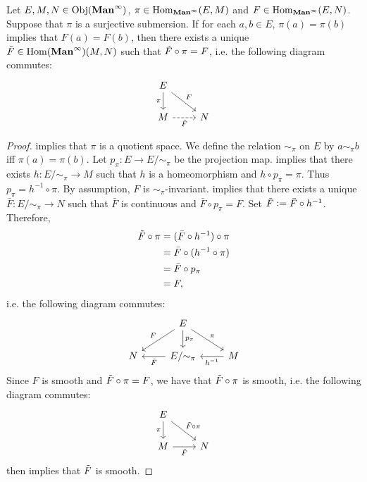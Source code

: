 \documentclass{book}
\begin{document}
	\begin{ex} 
		Let $E, M, N \in \operatorname{Obj}(\operatorname*{\text{\textbf{Man}}^{\infty}})$, $\pi \in \operatorname{Hom}_{\operatorname*{\text{\textbf{Man}}^{\infty}}}(E, M)$ and $F \in \operatorname{Hom}_{\operatorname*{\text{\textbf{Man}}^{\infty}}}(E, N)$. Suppose that $\pi$ is a surjective submersion. If for each $a,b \in E$, $\pi(a) = \pi(b)$ implies that $F(a) = F(b)$, then there exists a unique $\tilde{F} \in \operatorname{Hom}(\operatorname*{\text{\textbf{Man}}^{\infty}})(M, N)$ such that $\tilde{F} \circ \pi = F$, i.e. the following diagram commutes:
		\[ 
		\begin{tikzcd}
			E \arrow[d, "\pi"'] \arrow[dr, "F"] &   \\
			M \arrow[r, "\tl{F}"', dashrightarrow] &  N
		\end{tikzcd}
		\]
	\end{ex}

	\begin{proof}
		 implies that $\pi$ is a quotient space. We define the relation $\sim_{\pi}$ on $E$ by $a \sim_{\pi} b$ iff $\pi(a) = \pi(b)$. Let $p_{\pi}:E \rightarrow E/{\sim_{\pi}}$ be the projection map.  implies that there exists $h: E/{\sim_{\pi}} \rightarrow M$ such that $h$ is a homeomorphism and $h \circ p_{\pi} = \pi$. Thus $p_{\pi} = h^{-1} \circ \pi$. By assumption, $F$ is $\sim_{\pi}$-invariant.  implies that there exists a unique $\bar{F}: E/{\sim_{\pi}} \rightarrow N$ such that $\bar{F}$ is continuous and $\bar{F} \circ p_{\pi} = F$. Set $\tilde{F} \vcentcolon= \bar{F} \circ h^{-1}$. Therefore,
		\begin{align*}
			\tilde{F} \circ \pi
			& = (\bar{F} \circ h^{-1}) \circ \pi \\
			& = \bar{F} \circ (h^{-1} \circ \pi) \\
			& = \bar{F} \circ p_{\pi} \\
			& = F,
		\end{align*}
		i.e. the following diagram commutes: 
		\[ 
		\begin{tikzcd}
			& E \arrow[dl, "F"'] \arrow[d, "p_{\pi}"] \arrow[dr, "\pi"] &   \\
			N & E/{\sim_{\pi}} \arrow[l, "\bar{F}"] &  M \arrow[l, "h^{-1}"]
		\end{tikzcd}
		\]
		Since $F$ is smooth and $\tilde{F} \circ \pi = F$, we have that $\tilde{F} \circ \pi$ is smooth, i.e. the following diagram commutes: 
		\[ 
		\begin{tikzcd}
			E \arrow[d, "\pi"'] \arrow[dr, "\tl{F} \circ \pi"] &   \\
			M \arrow[r, "\tl{F}"'] &  N
		\end{tikzcd}
		\]
		 then implies that $\tilde{F}$ is smooth.
	\end{proof}
\end{document}
